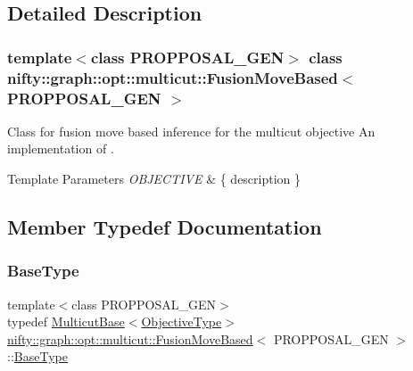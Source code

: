 \subsection{Detailed Description}
\subsubsection*{template$<$class P\+R\+O\+P\+P\+O\+S\+A\+L\+\_\+\+G\+EN$>$\newline
class nifty\+::graph\+::opt\+::multicut\+::\+Fusion\+Move\+Based$<$ P\+R\+O\+P\+P\+O\+S\+A\+L\+\_\+\+G\+E\+N $>$}

Class for fusion move based inference for the multicut objective An implementation of \cite{beier_15_funsion}. 


\begin{DoxyTemplParams}{Template Parameters}
{\em O\+B\+J\+E\+C\+T\+I\+VE} & \{ description \} \\
\hline
\end{DoxyTemplParams}


\subsection{Member Typedef Documentation}
\mbox{\label{classnifty_1_1graph_1_1opt_1_1multicut_1_1FusionMoveBased_a53a90e2ae7b5ea7b2b301283011056bc}} 
\subsubsection{\texorpdfstring{Base\+Type}{BaseType}}
{\footnotesize\ttfamily template$<$class P\+R\+O\+P\+P\+O\+S\+A\+L\+\_\+\+G\+EN$>$ \\
typedef \hyperlink{classnifty_1_1graph_1_1opt_1_1multicut_1_1MulticutBase}{Multicut\+Base}$<$\hyperlink{classnifty_1_1graph_1_1opt_1_1multicut_1_1FusionMoveBased_ac860a461dd2c12fd2e67553a4457ee58}{Objective\+Type}$>$ \hyperlink{classnifty_1_1graph_1_1opt_1_1multicut_1_1FusionMoveBased}{nifty\+::graph\+::opt\+::multicut\+::\+Fusion\+Move\+Based}$<$ P\+R\+O\+P\+P\+O\+S\+A\+L\+\_\+\+G\+EN $>$\+::\hyperlink{classnifty_1_1graph_1_1opt_1_1multicut_1_1FusionMoveBased_a53a90e2ae7b5ea7b2b301283011056bc}{Base\+Type}}

